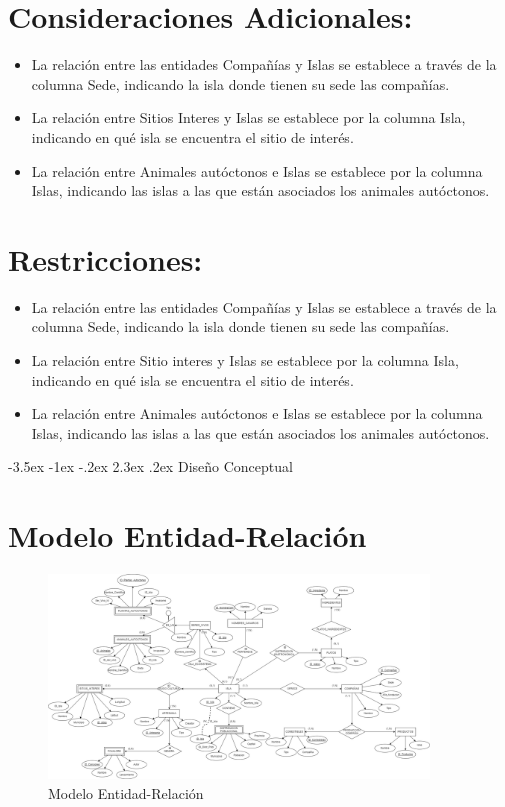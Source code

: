 \documentclass[11pt]{report}
\makeatletter
\renewcommand\chapter{\@startsection{chapter}{0}{\z@}%
    {-3.5ex \@plus -1ex \@minus -.2ex}%
    {2.3ex \@plus.2ex}%
    {\normalfont\Large\bfseries}}
\makeatother
\begin{document}
\section{Consideraciones Adicionales:}

\begin{itemize}
      \item La relación entre las entidades Compañías y Islas se establece a través de la columna Sede, indicando la isla donde tienen su sede las compañías.
      \item La relación entre Sitios Interes y Islas se establece por la columna Isla, indicando en qué isla se encuentra el sitio de interés.
      \item La relación entre Animales autóctonos e Islas se establece por la columna Islas, indicando las islas a las que están asociados los animales autóctonos.
\end{itemize}

\section{Restricciones:}

\begin{itemize}
      \item La relación entre las entidades Compañías y Islas se establece a través de la columna Sede, indicando la isla donde tienen su sede las compañías.
      \item La relación entre Sitio interes y Islas se establece por la columna Isla, indicando en qué isla se encuentra el sitio de interés.
      \item La relación entre Animales autóctonos e Islas se establece por la columna Islas, indicando las islas a las que están asociados los animales autóctonos.
\end{itemize}
\chapter{Diseño Conceptual}

\section{Modelo Entidad-Relación}
\begin{figure}[H]
      \centering
      \includegraphics[width=0.9\textwidth]{../diagrams/ER-PF-ADBD.png}
      \caption{Modelo Entidad-Relación}
      \label{fig:modelo_er}
\end{figure}
\end{document}
